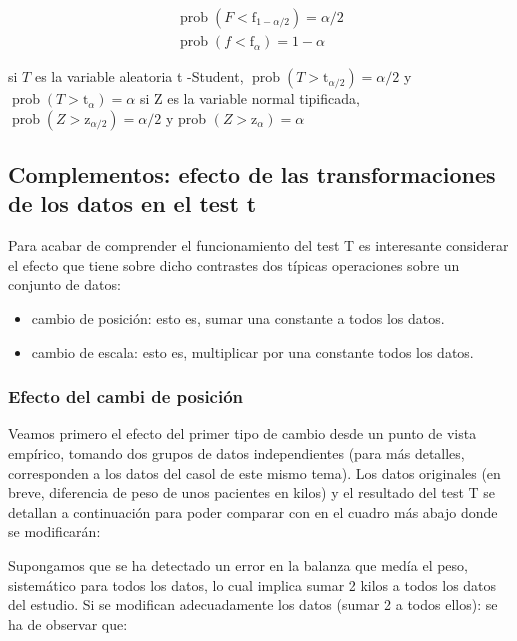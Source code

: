 \documentclass[
]{article}
\providecommand{\tightlist}{%
  \setlength{\itemsep}{0pt}\setlength{\parskip}{0pt}}
\begin{document}
\[
\begin{gathered}
\operatorname{prob}\left(F<\mathrm{f}_{1-\alpha / 2}\right)=\alpha / 2 \\
\operatorname{prob}\left(f<\mathrm{f}_{\alpha}\right)=1-\alpha
\end{gathered}
\]

si \(T\) es la variable aleatoria t -Student, \(\operatorname{prob}\left(T>\mathrm{t}_{\alpha / 2}\right)=\alpha / 2\) y \(\operatorname{prob}\left(T>\mathrm{t}_{\alpha}\right)=\alpha\)
si Z es la variable normal tipificada, \(\operatorname{prob}\left(Z>\mathrm{z}_{\alpha / 2}\right)=\alpha / 2\) y prob \(\left(Z>\mathrm{z}_{\alpha}\right)=\alpha\)

\subsection{Complementos: efecto de las transformaciones de los datos en el test t}\label{complementos-efecto-de-las-transformaciones-de-los-datos-en-el-test-t}

Para acabar de comprender el funcionamiento del test T es interesante considerar el efecto que tiene sobre dicho contrastes dos típicas operaciones sobre un conjunto de datos:

\begin{itemize}
\tightlist
\item
  cambio de posición: esto es, sumar una constante a todos los datos.
\item
  cambio de escala: esto es, multiplicar por una constante todos los datos.
\end{itemize}

\subsubsection{Efecto del cambi de posición}\label{efecto-del-cambi-de-posiciuxf3n}

Veamos primero el efecto del primer tipo de cambio desde un punto de vista empírico, tomando dos grupos de datos independientes (para más detalles, corresponden a los datos del casol de este mismo tema). Los datos originales (en breve, diferencia de peso de unos pacientes en kilos) y el resultado del test T se detallan a continuación para poder comparar con en el cuadro más abajo donde se modificarán:

Supongamos que se ha detectado un error en la balanza que medía el peso, sistemático para todos los datos, lo cual implica sumar 2 kilos a todos los datos del estudio. Si se modifican adecuadamente los datos (sumar 2 a todos ellos):
se ha de observar que:
\end{document}
